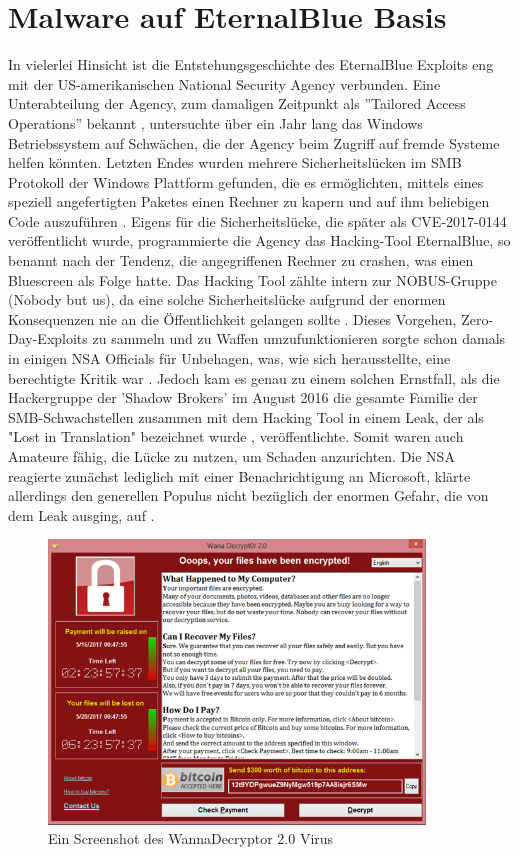 \documentclass[DIV=12,headings=normal,pdftex,headinclude=false,footinclude=false,final]{scrreprt}
\begin{document}
\chapter{Malware auf EternalBlue Basis}
In vielerlei Hinsicht ist die Entstehungsgeschichte des EternalBlue Exploits eng mit der US-amerikanischen National Security Agency verbunden. Eine Unterabteilung der Agency, zum damaligen Zeitpunkt als ''Tailored Access Operations'' bekannt \cite{CS}, untersuchte über ein Jahr lang das Windows Betriebssystem auf Schwächen, die der Agency beim Zugriff auf fremde Systeme helfen könnten\cite{WP}. Letzten Endes wurden mehrere Sicherheitslücken im SMB Protokoll der Windows Plattform gefunden, die es ermöglichten, mittels eines speziell angefertigten Paketes einen Rechner zu kapern und auf ihm beliebigen Code auszuführen \cite{Avast}.
Eigens für die Sicherheitslücke, die später als CVE-2017-0144 veröffentlicht wurde, programmierte die Agency das Hacking-Tool EternalBlue, so benannt nach der Tendenz, die angegriffenen Rechner zu crashen, was einen Bluescreen als Folge hatte. Das Hacking Tool zählte intern zur NOBUS-Gruppe (Nobody but us), da eine solche Sicherheitslücke aufgrund der enormen Konsequenzen nie an die Öffentlichkeit gelangen sollte \cite{CS}. Dieses Vorgehen, Zero-Day-Exploits zu sammeln und zu Waffen umzufunktionieren sorgte schon damals in einigen NSA Officials für Unbehagen, was, wie sich herausstellte, eine berechtigte Kritik war \cite{WP}.
Jedoch kam es genau zu einem solchen Ernstfall, als die Hackergruppe der 'Shadow Brokers' im August 2016 die gesamte Familie der SMB-Schwachstellen zusammen mit dem Hacking Tool in einem Leak, der als "Lost in Translation" bezeichnet wurde \cite{Medium:ExpBible}, veröffentlichte. Somit waren auch Amateure fähig, die Lücke zu nutzen, um Schaden anzurichten. Die NSA reagierte zunächst lediglich mit einer Benachrichtigung an Microsoft, klärte allerdings den generellen Populus nicht bezüglich der enormen Gefahr, die von dem Leak ausging, auf \cite{WP}.

\begin{figure}[H]
    \centering
    \includegraphics[width=10cm]{wanna_decrypt0r_2.0.png}
    \caption[WannaDecryptor Screenshot, URL: \url{https://securelist.com/   wannacry-ransomware-used-in-widespread-attacks-all-over-the-world/78351/}]{Ein Screenshot des  WannaDecryptor 2.0 Virus}
    \label{img:wanna_decrypt0r}
\end{figure}
\end{document}
